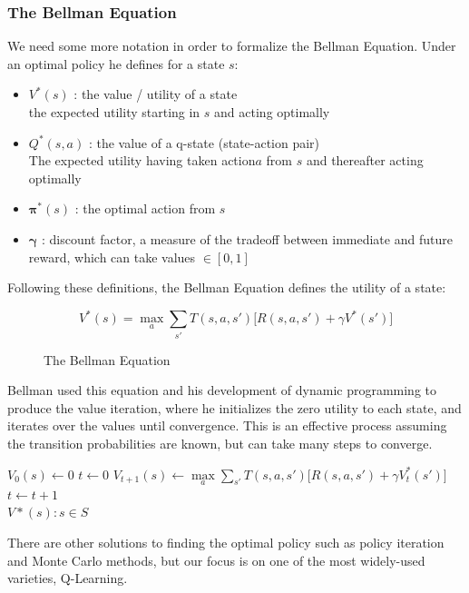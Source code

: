 \documentclass[letterpaper]{article}
\begin{document}
\subsubsection{The Bellman Equation}
We need some more notation in order to formalize the Bellman Equation. Under an optimal policy he defines for a state $s$:
\begin{itemize}
	\item
	$V^*(s)$ : the value / utility of a state\\
	 the expected utility starting in $s$ and acting optimally
	 \item
	 $Q^*(s,a)$ : the value of a q-state (state-action pair)\\
	 The expected utility having taken action$a$ from $s$ and thereafter acting optimally
	 \item
	 $\boldsymbol{\pi}^*(s)$ : the optimal action from $s$
	 \item
	 $\boldsymbol{\gamma}$ : discount factor, a measure of the tradeoff between immediate and future reward, which can take values $\in [0,1]$
\end{itemize}
Following these definitions, the Bellman Equation defines the utility of a state:
\begin{figure}[H]
\centering
\[
V^*(s) = \max\limits_{a}\sum\limits_{s'}T(s,a,s')\big[R(s,a,s') + \gamma V^*(s')\big]
\]
\caption{The Bellman Equation}
\end{figure}
Bellman used this equation and his development of dynamic programming to produce the value iteration, where he initializes the zero utility to each state,
and iterates over the values until convergence. This is an effective process assuming the transition probabilities are known, but can take many steps to 
converge.
\begin{algorithmic}[1]
        \State $V_{0}(s) \gets 0$
\EndFor
\State $t \gets 0$
\State \scriptsize$V_{t+1}(s) \gets \max\limits_{a}\sum\limits_{s'}T(s,a,s')\big[R(s,a,s') + \gamma V_{t}^*(s')\big]$\normalsize
\State $t \gets t + 1$
\\
\Return $V*(s) : s \in S$
\EndProcedure
\end{algorithmic}
There are other solutions to finding the optimal policy such as policy iteration and Monte Carlo methods, but our focus is on one of the most widely-used
varieties, Q-Learning.
\end{document}
